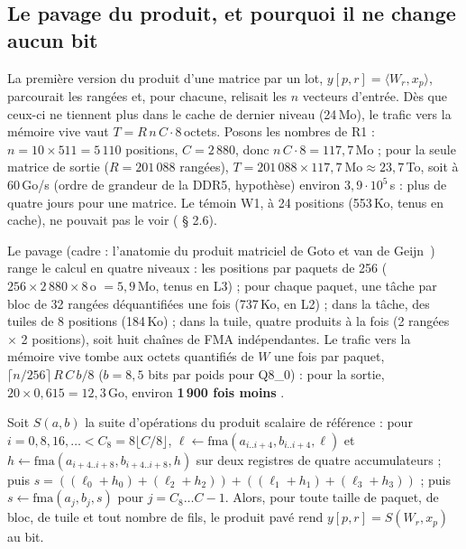 \subsection{Le pavage du produit, et pourquoi il ne change aucun bit}\label{sec:t2r-pavage}

La première version du produit d'une matrice par un lot, $y[p, r] = \langle W_r, x_p\rangle$, parcourait les rangées et, pour chacune, relisait les $n$ vecteurs d'entrée. Dès que ceux-ci ne tiennent plus dans le cache de dernier niveau (24\,Mo), le trafic vers la mémoire vive vaut $T = R\,n\,C \cdot 8$\,octets. Posons les nombres de R1 \calc : $n = 10 \times 511 = 5\,110$ positions, $C = 2\,880$, donc $n\,C\cdot 8 = 117{,}7$\,Mo ; pour la seule matrice de sortie ($R = 201\,088$ rangées), $T = 201\,088 \times 117{,}7~\text{Mo} \approx 23{,}7$\,To, soit à 60\,Go/s (ordre de grandeur de la DDR5, hypothèse) environ $3{,}9\cdot10^5$\,s : plus de quatre jours pour une matrice. Le témoin W1, à 24 positions (553\,Ko, tenus en cache), ne pouvait pas le voir ( § 2.6).

Le pavage (cadre : l'anatomie du produit matriciel de Goto et van de Geijn~\cite{goto2008anatomy}) range le calcul en quatre niveaux : les positions par paquets de 256 ($256 \times 2\,880 \times 8$\,o $= 5{,}9$\,Mo, tenus en L3) ; pour chaque paquet, une tâche par bloc de 32 rangées déquantifiées une fois (737\,Ko, en L2) ; dans la tâche, des tuiles de 8 positions (184\,Ko) ; dans la tuile, quatre produits à la fois (2 rangées $\times$ 2 positions), soit huit chaînes de FMA indépendantes. Le trafic vers la mémoire vive tombe aux octets quantifiés de $W$ une fois par paquet, $\lceil n/256\rceil\, R\, C\, b/8$ ($b = 8{,}5$ bits par poids pour Q8\_0) : pour la sortie, $20 \times 0{,}615 = 12{,}3$\,Go, environ \textbf{1\,900 fois moins} \calc.

\begin{proposition}\label{prop:t2r-pavage}
Soit $S(a, b)$ la suite d'opérations du produit scalaire de référence : pour $i = 0, 8, 16, \ldots < C_8 = 8\lfloor C/8\rfloor$, $\ell \leftarrow \mathrm{fma}(a_{i..i+4}, b_{i..i+4}, \ell)$ et $h \leftarrow \mathrm{fma}(a_{i+4..i+8}, b_{i+4..i+8}, h)$ sur deux registres de quatre accumulateurs ; puis $s = ((\ell_0 + h_0) + (\ell_2 + h_2)) + ((\ell_1 + h_1) + (\ell_3 + h_3))$ ; puis $s \leftarrow \mathrm{fma}(a_j, b_j, s)$ pour $j = C_8 \ldots C-1$. Alors, pour toute taille de paquet, de bloc, de tuile et tout nombre de fils, le produit pavé rend $y[p, r] = S(W_r, x_p)$ au bit.
\end{proposition}

